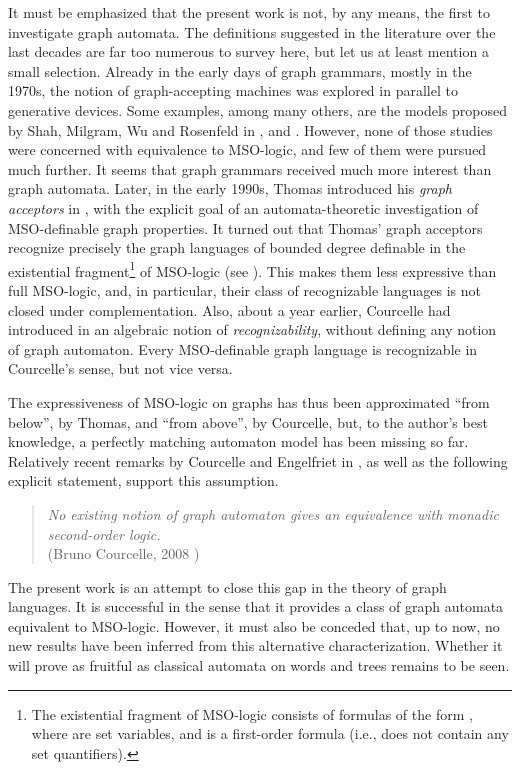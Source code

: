 \documentclass[a4paper,11pt,twoside]{report} \pdfoutput=1
\begin{document}
It must be emphasized that the present work is not, by any means, the
first to investigate graph automata. The definitions suggested in the
literature over the last decades are far too numerous to survey here,
but let us at least mention a small selection. Already in the early
days of graph grammars, mostly in the 1970s, the notion of
graph-accepting machines was explored in parallel to generative
devices. Some examples, among many others, are the models proposed by
Shah, Milgram, Wu and Rosenfeld in \cite{SMR73}, \cite{Mil75} and
\cite{WR79}. However, none of those studies were concerned with
equivalence to MSO-logic, and few of them were pursued much
further. It seems that graph grammars received much more interest than
graph automata. Later, in the early 1990s, Thomas introduced his
\emph{graph acceptors} in \cite{Tho91}, with the explicit goal of an
automata-theoretic investigation of MSO-definable graph properties. It
turned out that Thomas' graph acceptors recognize precisely the graph
languages of bounded degree definable in the existential
fragment\footnote{The existential fragment of MSO-logic consists of
  formulas of the form , where
   are set variables, and  is a
  first-order formula (i.e.,  does not contain any set
  quantifiers).} of MSO-logic (see \cite[Thm~3]{Tho97}). This makes
them less expressive than full MSO-logic, and, in particular, their
class of recognizable languages is not closed under
complementation. Also, about a year earlier, Courcelle had introduced
in \cite{Cou90} an algebraic notion of \emph{recognizability}, without
defining any notion of graph automaton. Every MSO-definable graph
language is recognizable in Courcelle's sense, but not vice versa.

The expressiveness of MSO-logic on graphs has thus been approximated
“from below”, by Thomas, and “from above”, by Courcelle, but, to the
author's best knowledge, a perfectly matching automaton model has been
missing so far. Relatively recent remarks by Courcelle and Engelfriet
in \cite{CE12}, as well as the following explicit statement, support
this assumption.

\begin{quote}
  \emph{No existing notion of graph automaton gives an equivalence
    with monadic second-order logic.} \\
  \hspace*{\fill} (Bruno Courcelle, 2008 \cite[p.~8]{Cou08})
\end{quote}

The present work is an attempt to close this gap in the theory of
graph languages. It is successful in the sense that it provides a
class of graph automata equivalent to MSO-logic. However, it must also
be conceded that, up to now, no new results have been inferred from
this alternative characterization. Whether it will prove as fruitful
as classical automata on words and trees remains to be seen.
\end{document}
